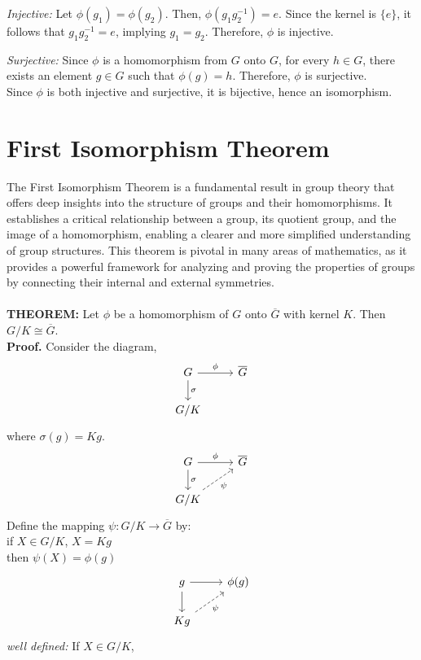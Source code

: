 \textit{Injective:} Let \( \phi(g_1) = \phi(g_2) \). Then, \( \phi(g_1g_2^{-1}) = e \). Since the kernel is \( \{e\} \), it follows that \( g_1g_2^{-1} = e \), implying \( g_1 = g_2 \). Therefore, \( \phi \) is injective.

\textit{Surjective:} Since \( \phi \) is a homomorphism from \( G \) onto \( G \), for every \( h \in G \), there exists an element \( g \in G \) such that \( \phi(g) = h \). Therefore, \( \phi \) is surjective.\\
Since \( \phi \) is both injective and surjective, it is bijective, hence an isomorphism.

\section{First Isomorphism Theorem}
The First Isomorphism Theorem is a fundamental result in group theory that offers deep insights into the structure of groups and their homomorphisms. It establishes a critical relationship between a group, its quotient group, and the image of a homomorphism, enabling a clearer and more simplified understanding of group structures. This theorem is pivotal in many areas of mathematics, as it provides a powerful framework for analyzing and proving the properties of groups by connecting their internal and external symmetries.
\\\\
\textbf{THEOREM: }Let \(\phi\) be a homomorphism of \(G\) onto \(\overline{G}\) with kernel \(K\). Then \(G / K \cong \overline{G}\).\\
\textbf{Proof.} Consider the diagram,
\[
\begin{tikzcd}
G \arrow[r, "\phi"] \arrow[d,"\sigma"] & \overline{G} \\
G/K 
\end{tikzcd}
\]
where \(\sigma(g) = Kg\).
\[
\begin{tikzcd}
G \arrow[r, "\phi"] \arrow[d,"\sigma"] & \overline{G} \\
G/K \arrow[ur, dashed, "\psi"']
\end{tikzcd}
\]
Define the mapping \(\psi: G/K \xrightarrow{} \overline{G}\) by:\\
if \(X \in G/K\), \(X = Kg\) \\then \(\psi(X) = \phi(g)\) 
\[
\begin{tikzcd}
g \arrow[r] \arrow[d] & \phi(g) \\
Kg \arrow[ur, dashed, "\psi"']
\end{tikzcd}
\]
\textit{well defined:} If \( X \in G/K \), 

